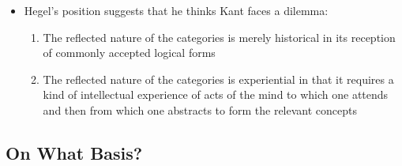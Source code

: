 \documentclass[12pt]{article}
\begin{document}
\begin{itemize}
\item Hegel's position suggests that he thinks Kant faces a dilemma:
\begin{enumerate}
\item The reflected nature of the categories is merely historical in its
reception of commonly accepted logical forms
\item The reflected nature of the categories is experiential in that it
requires a kind of intellectual experience of acts of the mind to which
one attends and then from which one abstracts to form the relevant concepts
\end{enumerate}
\end{itemize}


\subsection{On What Basis?}
\label{sec:org665ee55}
\end{document}
